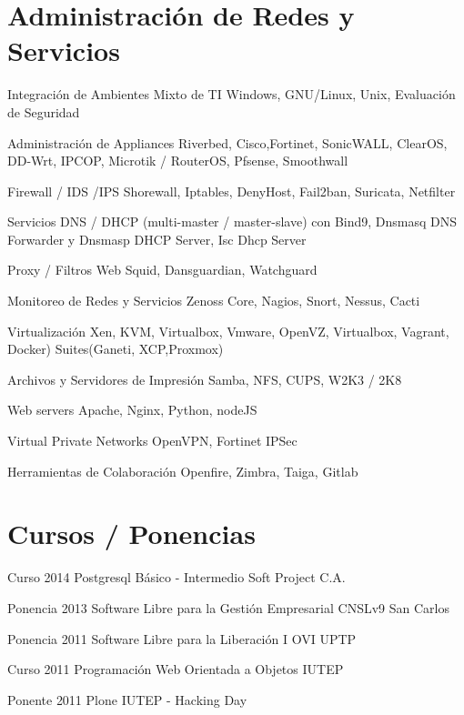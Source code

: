 \documentclass{tccv}
\begin{document}
\section{Administraci\'on de Redes y Servicios}
\begin{servicios}
\item{}
     {Integraci\'on de   Ambientes Mixto de TI}
     {Windows, GNU/Linux, Unix, Evaluación de Seguridad}
\item{}
     {Administraci\'on de Appliances}
     {Riverbed, Cisco,Fortinet, SonicWALL, ClearOS, DD-Wrt, IPCOP, Microtik / RouterOS, Pfsense, Smoothwall}
\item{}
     {Firewall / IDS /IPS}
     {Shorewall, Iptables, DenyHost, Fail2ban, Suricata, Netfilter}
\item{}
     {Servicios DNS / DHCP}
     {(multi-master / master-slave) con Bind9, Dnsmasq DNS Forwarder y Dnsmasp DHCP Server, Isc Dhcp Server}
\item{}
     {Proxy / Filtros Web}
     {Squid, Dansguardian, Watchguard}
\item{}
     {Monitoreo de Redes y Servicios}
     {Zenoss Core, Nagios, Snort, Nessus, Cacti}
\item{}
     {Virtualizaci\'on}
     {Xen, KVM, Virtualbox, Vmware, OpenVZ, Virtualbox, Vagrant, Docker) Suites(Ganeti, XCP,Proxmox)}
\item{}
{Archivos y Servidores de Impresi\'on}
     {Samba, NFS, CUPS, W2K3 / 2K8}
\item{}
     {Web servers}
     {Apache, Nginx, Python, nodeJS}
\item{}
     {Virtual Private Networks}
     {OpenVPN, Fortinet IPSec}
\item{}
     {Herramientas de Colaboraci\'on}
     {Openfire, Zimbra, Taiga, Gitlab}
\end{servicios}

\section{Cursos / Ponencias}

\begin{cyp}

\item[Curso]{2014}
     {Postgresql B\'asico - Intermedio}
     {Soft Project C.A.}

\item[Ponencia]{2013}
     {Software Libre para la Gesti\'on Empresarial}
     {CNSLv9 San Carlos}

\item[Ponencia]{2011}
     {Software Libre para la Liberaci\'on}
     {I OVI UPTP}
     
\item[Curso]{2011}
     {Programaci\'on Web Orientada a Objetos}
     {IUTEP} 

\item[Ponente]{2011}
     {Plone}
     {IUTEP - Hacking Day}

\end{cyp}
\end{document}
